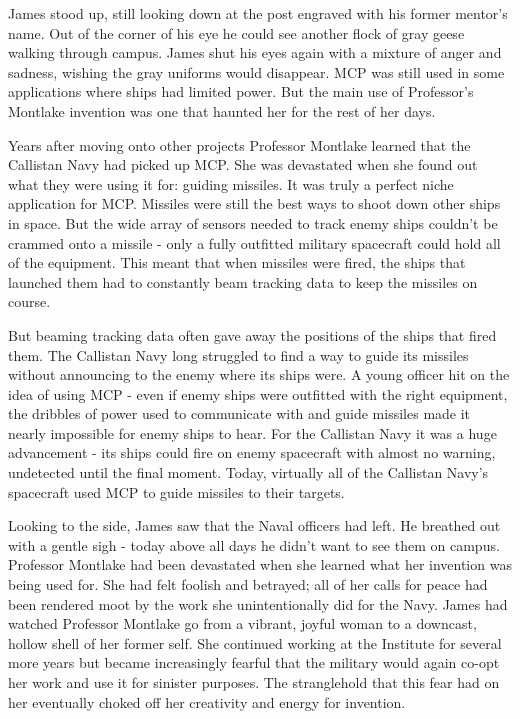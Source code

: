 \documentclass[12pt]{article} %
\begin{document}
James stood up, still looking down at the post engraved with his former mentor's name. Out of the corner of his eye he could see another flock of gray geese walking through campus. James shut his eyes again with a mixture of anger and sadness, wishing the gray uniforms would disappear. MCP was still used in some applications where ships had limited power. But the main use of Professor's Montlake invention was one that haunted her for the rest of her days.

Years after moving onto other projects Professor Montlake learned that the Callistan Navy had picked up MCP. She was devastated when she found out what they were using it for: guiding missiles. It was truly a perfect niche application for MCP. Missiles were still the best ways to shoot down other ships in space. But the wide array of sensors needed to track enemy ships couldn't be crammed onto a missile - only a fully outfitted military spacecraft could hold all of the equipment. This meant that when missiles were fired, the ships that launched them had to constantly beam tracking data to keep the missiles on course.

But beaming tracking data often gave away the positions of the ships that fired them. The Callistan Navy long struggled to find a way to guide its missiles without announcing to the enemy where its ships were. A young officer hit on the idea of using MCP - even if enemy ships were outfitted with the right equipment, the dribbles of power used to communicate with and guide missiles made it nearly impossible for enemy ships to hear. For the Callistan Navy it was a huge advancement - its ships could fire on enemy spacecraft with almost no warning, undetected until the final moment. Today, virtually all of the Callistan Navy's spacecraft used MCP to guide missiles to their targets.

Looking to the side, James saw that the Naval officers had left. He breathed out with a gentle sigh - today above all days he didn't want to see them on campus. Professor Montlake had been devastated when she learned what her invention was being used for. She had felt foolish and betrayed; all of her calls for peace had been rendered moot by the work she unintentionally did for the Navy. James had watched Professor Montlake go from a vibrant, joyful woman to a downcast, hollow shell of her former self. She continued working at the Institute for several more years but became increasingly fearful that the military would again co-opt her work and use it for sinister purposes. The stranglehold that this fear had on her eventually choked off her creativity and energy for invention.
\end{document}
